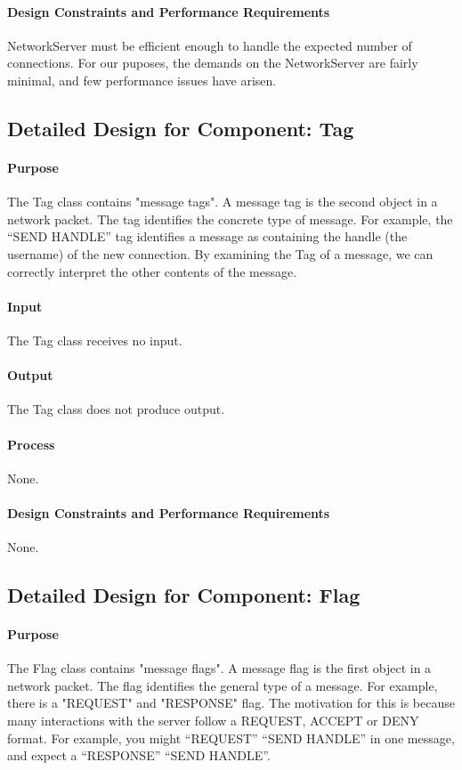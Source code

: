 \documentclass[12pt,a4paper,titlepage]{article}
\begin{document}
\paragraph{Design Constraints and Performance Requirements} NetworkServer must be efficient enough to handle the expected number of connections. For our puposes, the demands on the NetworkServer are fairly minimal, and few performance issues have arisen.

\subsection{Detailed Design for Component: Tag }
\paragraph{Purpose} The Tag class contains "message tags". A message tag is the second object in a network packet. The tag identifies the concrete type of message. For example, the ``SEND HANDLE'' tag identifies a message as containing the handle (the username) of the new connection. By examining the Tag of a message, we can correctly interpret the other contents of the message. 
\paragraph{Input} The Tag class receives no input. 
\paragraph{Output} The Tag class does not produce output. 
\paragraph{Process} None. 
\paragraph{Design Constraints and Performance Requirements} None.

\subsection{Detailed Design for Component: Flag }
\paragraph{Purpose} The Flag class contains "message flags". A message flag is the first object in a network packet. The flag identifies the general type of a message. For example, there is a "REQUEST" and "RESPONSE" flag. The motivation for this is because many interactions with the server follow a REQUEST, ACCEPT or DENY format. For example, you might ``REQUEST'' ``SEND HANDLE'' in one message, and expect a ``RESPONSE'' ``SEND HANDLE''.
\end{document}
